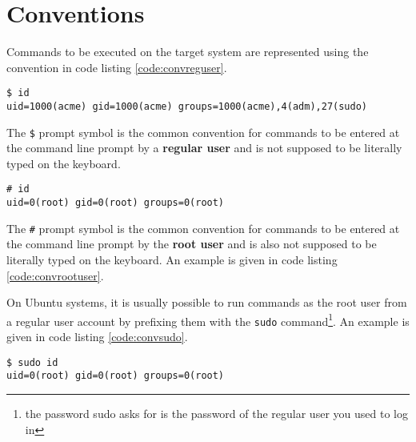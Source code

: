 \section{Conventions}

Commands to be executed on the target system are represented using the  convention in code listing \ref{code:convreguser}.

\begin{lstlisting}[label=code:convreguser,caption=Command line example as a regular user]
$ id
uid=1000(acme) gid=1000(acme) groups=1000(acme),4(adm),27(sudo)
\end{lstlisting}

The \texttt{\$} prompt symbol is the common convention for commands to be entered at the command line prompt by a \textbf{regular user} and is not supposed to be literally typed on the keyboard. 

\begin{lstlisting}[label=code:convrootuser,caption=Command line example as the root user]
# id
uid=0(root) gid=0(root) groups=0(root)
\end{lstlisting}

The \texttt{\#} prompt symbol is the common convention for commands to be entered at the command line prompt by the \textbf{root user} and is also not supposed to be literally typed on the keyboard. An example is given in code listing \ref{code:convrootuser}.

On Ubuntu systems, it is usually possible to run commands as the root user from a regular user account by prefixing them with the \texttt{sudo} command\footnote{the password sudo asks for is the password of the regular user you used to log in}. An example is given in code listing \ref{code:convsudo}.

\begin{lstlisting}[label=code:convsudo,caption=Command line example as the root user using sudo]
$ sudo id
uid=0(root) gid=0(root) groups=0(root)
\end{lstlisting}
